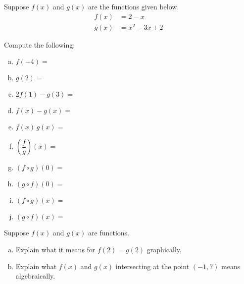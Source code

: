 \documentclass[11pt,letterpaper]{article}
\begin{document}
 Suppose $f(x)$ and $g(x)$ are the functions given below. 
	\[
	\begin{aligned}
	f(x)&= 2 - x \\[0.3cm]
	g(x)&= x^2 - 3x + 2
	\end{aligned}
	\]

Compute the following: \pspace
\begin{enumerate}[(a)]
\item $f(-4)=$ \vfill
\item $g(2)=$ \vfill
\item $2f(1) - g(3)=$ \vfill
\item $f(x) - g(x)=$ \vfill
\item $f(x) \, g(x)=$ \vfill
\item $\left( \dfrac{f}{g} \right)(x)=$ \vfill
\item $(f \circ g)(0)=$ \vfill
\item $(g \circ f)(0)=$ \vfill
\item $(f \circ g)(x)=$ \vfill
\item $(g \circ f)(x)=$ \vfill
\end{enumerate} 



\newpage



 Suppose $f(x)$ and $g(x)$ are functions. 
	\begin{enumerate}[(a)]
	\item Explain what it means for $f(2)= g(2)$ graphically. 
	\item Explain what $f(x)$ and $g(x)$ intersecting at the point $(-1, 7)$ means algebraically. 
	\end{enumerate}
\end{document}
